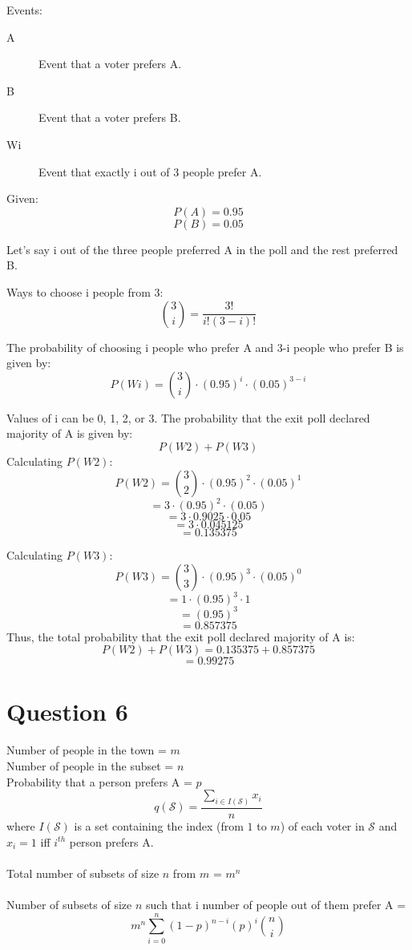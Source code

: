 \documentclass{report}
\begin{document}
Events:
\begin{description}
    \item[A] Event that a voter prefers A.
    \item[B] Event that a voter prefers B.
    \item[Wi] Event that exactly i out of 3 people prefer A.
\end{description}

Given:
\[P(A) = 0.95\]
\[P(B) = 0.05\]

Let's say i out of the three people preferred A in the poll and the rest preferred B.

Ways to choose i people from 3:
\begin{equation}
\binom{3}{i} = \frac{3!}{i!(3-i)!}
\label{eq:binomial}
\end{equation}

The probability of choosing i people who prefer A and 3-i people who prefer B is given by:
\[ P(Wi) = \binom{3}{i} \cdot (0.95)^i \cdot (0.05)^{3-i}\]  

Values of i can be 0, 1, 2, or 3.
The probability that the exit poll declared majority of A is given by:
\[P(W2) + P(W3)\]
Calculating \( P(W2) \):
\[P(W2) = \binom{3}{2} \cdot (0.95)^2 \cdot (0.05)^1\]
\[= 3 \cdot (0.95)^2 \cdot (0.05)\]
\[= 3 \cdot 0.9025 \cdot 0.05\]
\[= 3 \cdot 0.045125\]
\[= 0.135375\]      

Calculating \( P(W3) \):
\[P(W3) = \binom{3}{3} \cdot (0.95)^3 \cdot (0.05)^0\]
\[= 1 \cdot (0.95)^3 \cdot 1\]
\[= (0. 95)^3\]
\[= 0.857375\]
Thus, the total probability that the exit poll declared majority of A is:
\[P(W2) + P(W3) = 0.135375 + 0.857375\]
\[= 0.99275\]

\section*{Question 6}

Number of people in the town = \( m \) \\
Number of people in the subset = \( n \) \\
Probability that a person prefers A = \( p \) \\
\[
q(\mathcal{S}) = \frac{\sum_{i \in I(\mathcal{S})} x_i}{n}
\]
where \( I(\mathcal{S}) \) is a set containing the index (from \(1\) to \(m\)) of each voter in \(\mathcal{S}\) and \(x_i = 1\) iff \( i^{th}\) person prefers A.
\\ \\
Total number of subsets of size \( n \) from \( m \) = \(m ^ n\)\\\\
Number of subsets of size \(n\) such that i number of people out of them prefer A = \[ m^n \sum_{i=0}^{n} (1-p) ^{n - i} (p)^i\binom{n}{i} \]
\end{document}
